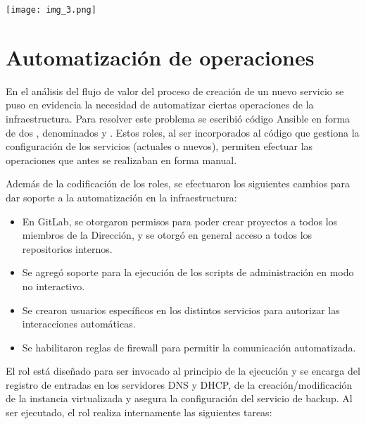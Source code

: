 
\texttt{[image: img\_3.png]}



\section{Automatización de operaciones}

En el análisis del flujo de valor del proceso de creación de un nuevo
servicio se puso en evidencia la necesidad de automatizar ciertas
operaciones de la infraestructura. Para resolver este problema se
escribió código Ansible en forma de dos , denominados
 y . Estos roles, al ser
incorporados al código que gestiona la configuración de los servicios
(actuales o nuevos), permiten efectuar las operaciones que antes se
realizaban en forma manual.

Además de la codificación de los roles, se efectuaron los siguientes
cambios para dar soporte a la automatización en la infraestructura:

\begin{itemize}
\item En GitLab, se otorgaron permisos para poder crear proyectos a
  todos los miembros de la Dirección, y se otorgó en general acceso a
  todos los repositorios internos.
\item Se agregó soporte para la ejecución de los scripts de
  administración en modo no interactivo.
\item Se crearon usuarios específicos en los distintos servicios para
  autorizar las interacciones automáticas.
\item Se habilitaron reglas de firewall para permitir la comunicación
  automatizada.
\end{itemize}
El rol  está diseñado para ser invocado al principio
de la ejecución y se encarga del registro de entradas en los
servidores DNS y DHCP, de la creación/modificación de la instancia
virtualizada y asegura la configuración del servicio de backup. Al ser
ejecutado, el rol realiza internamente las siguientes tareas:

